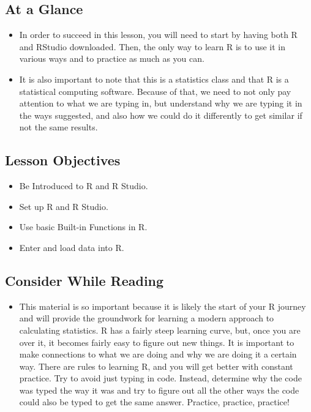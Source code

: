 \documentclass[
  letterpaper,
  DIV=11,
  numbers=noendperiod]{scrreprt}
\providecommand{\tightlist}{%
  \setlength{\itemsep}{0pt}\setlength{\parskip}{0pt}}\usepackage{longtable,booktabs,array}
\begin{document}
\subsection{At a Glance}\label{at-a-glance}

\begin{itemize}
\tightlist
\item
  In order to succeed in this lesson, you will need to start by having
  both R and RStudio downloaded. Then, the only way to learn R is to use
  it in various ways and to practice as much as you can.
\item
  It is also important to note that this is a statistics class and that
  R is a statistical computing software. Because of that, we need to not
  only pay attention to what we are typing in, but understand why we are
  typing it in the ways suggested, and also how we could do it
  differently to get similar if not the same results.
\end{itemize}

\subsection{Lesson Objectives}\label{lesson-objectives}

\begin{itemize}
\tightlist
\item
  Be Introduced to R and R Studio.
\item
  Set up R and R Studio.
\item
  Use basic Built-in Functions in R.
\item
  Enter and load data into R.
\end{itemize}

\subsection{Consider While Reading}\label{consider-while-reading}

\begin{itemize}
\tightlist
\item
  This material is so important because it is likely the start of your R
  journey and will provide the groundwork for learning a modern approach
  to calculating statistics. R has a fairly steep learning curve, but,
  once you are over it, it becomes fairly easy to figure out new things.
  It is important to make connections to what we are doing and why we
  are doing it a certain way. There are rules to learning R, and you
  will get better with constant practice. Try to avoid just typing in
  code. Instead, determine why the code was typed the way it was and try
  to figure out all the other ways the code could also be typed to get
  the same answer. Practice, practice, practice!
\end{itemize}
\end{document}

